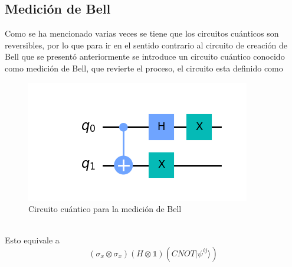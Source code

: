 \documentclass[a4paper]{article}
\begin{document}
\subsection{Medición de Bell}
Como se ha mencionado varias veces se tiene que los circuitos cuánticos son reversibles, por lo que para ir en el sentido contrario al circuito de creación de Bell que se presentó anteriormente se introduce un circuito cuántico conocido como medición de Bell, que revierte el proceso, el circuito esta definido como 
\begin{figure}[h]
\begin{center}
\includegraphics[scale=0.69]{./Bell_measurement.png} 
\end{center} 
\caption{Circuito cuántico para la medición de Bell}
\label{fig::Bell_measurement}
\end{figure}\\
Esto equivale a 
\begin{equation}
(\sigma_x\otimes\sigma_x)(H\otimes\mathbb{1})(CNOT|\psi^{ij}\rangle)
\end{equation}
\end{document}
